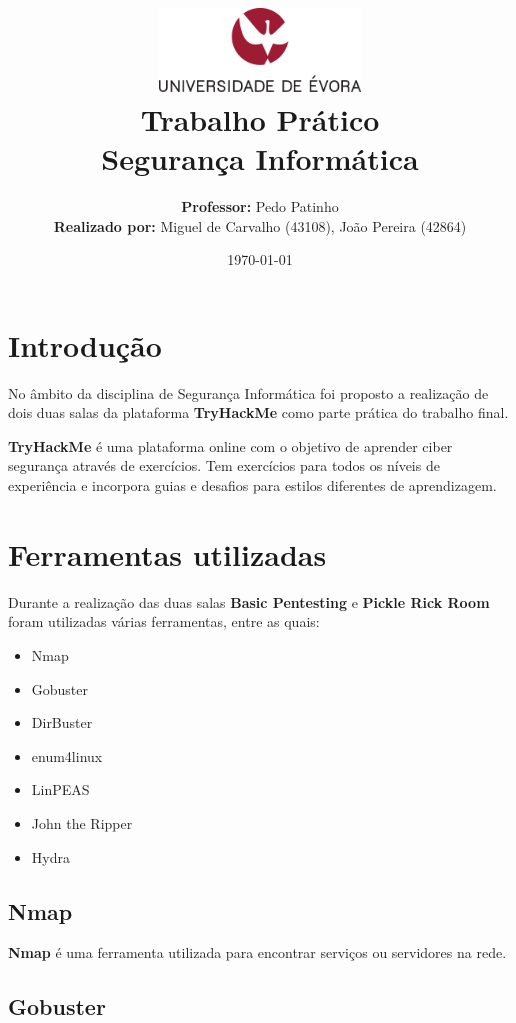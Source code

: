 \documentclass[11pt]{article}
\title
{
    \includegraphics[width=0.4\textwidth]{imgs/university.png}
    \\[0.1cm]
    \textbf{Trabalho Prático} \\
    Segurança Informática
}
\author
{
    \textbf{Professor:} Pedo Patinho \\
    \textbf{Realizado por:} Miguel de Carvalho (43108), João Pereira (42864) 
}
\date{\today}
\begin{document}
\maketitle

\section{Introdução}

\hspace{0.6cm}No âmbito da disciplina de Segurança Informática foi proposto a realização de dois  duas salas da plataforma \textbf{TryHackMe} como parte prática do trabalho final.

\textbf{TryHackMe} é uma plataforma online com o objetivo de aprender ciber segurança através de exercícios. Tem exercícios para todos os níveis de experiência e incorpora guias e desafios para estilos diferentes de aprendizagem.

\section{Ferramentas utilizadas}

Durante a realização das duas salas \textbf{Basic Pentesting} e \textbf{Pickle Rick Room} foram utilizadas várias ferramentas, entre as quais:

\begin{itemize}
    \item Nmap
    \item Gobuster
    \item DirBuster
    \item enum4linux
    \item LinPEAS
    \item John the Ripper
    \item Hydra
\end{itemize}

\newpage

\subsection{Nmap}

\textbf{Nmap} é uma ferramenta utilizada para encontrar serviços ou servidores na rede.

\subsection{Gobuster}
\end{document}

